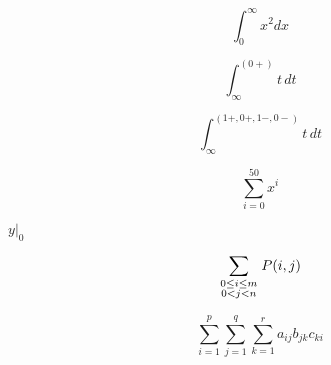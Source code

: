 \documentclass{article}
\begin{document}

\[ \int_0^\infty x^2 dx \]

\[ \int_\infty^{(0+)} t\,dt \]

\[ \int_\infty^{(1+,0+,1−,0−)} t\,dt \]

\[ \sum_{i=0}^{50} x^i \]

$\left. y \right|_0$

\[\sum_{\scriptstyle0\le i\le m\atop\scriptstyle0<j<n}P(i,j) \]

\[\sum_{i=1}^p\sum_{j=1}^q\sum_{k=1}^r a_{ij}b_{jk}c_{ki} \]
\end{document}
